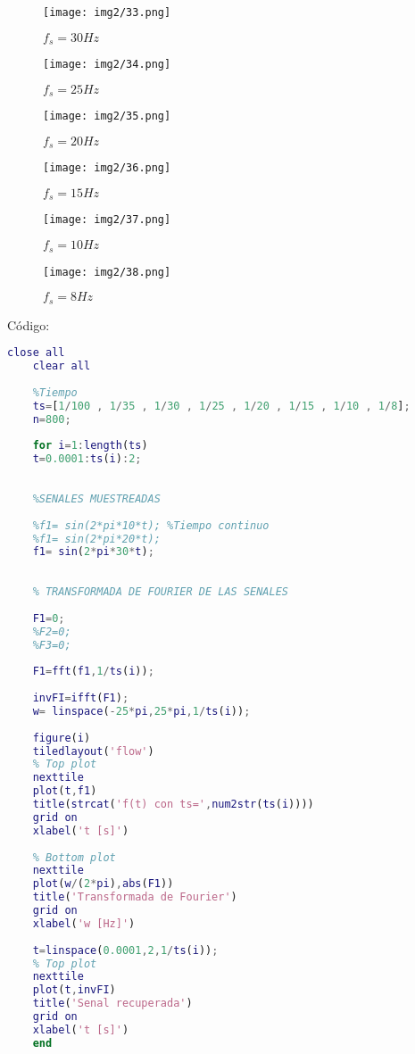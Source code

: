 \newpage

\begin{figure}[!htbp]
	\centering
	\texttt{[image: img2/33.png]}
	\caption{$f_s= 30 Hz$}
\end{figure}

\begin{figure}[!htbp]
	\centering
	\texttt{[image: img2/34.png]}
	\caption{$f_s= 25 Hz$}
\end{figure}

\newpage

\begin{figure}[!htbp]
	\centering
	\texttt{[image: img2/35.png]}
	\caption{$f_s= 20 Hz$}
\end{figure}

\begin{figure}[!htbp]
	\centering
	\texttt{[image: img2/36.png]}
	\caption{$f_s= 15 Hz$}
\end{figure}

\newpage

\begin{figure}[!htbp]
	\centering
	\texttt{[image: img2/37.png]}
	\caption{$f_s= 10 Hz$}
\end{figure}

\begin{figure}[!htbp]
	\centering
	\texttt{[image: img2/38.png]}
	\caption{$f_s= 8 Hz$}
\end{figure}

\newpage

Código:

\begin{lstlisting}[language=Matlab]
	close all
	clear all 
	
	%Tiempo
	ts=[1/100 , 1/35 , 1/30 , 1/25 , 1/20 , 1/15 , 1/10 , 1/8];
	n=800;
	
	for i=1:length(ts)
	t=0.0001:ts(i):2;
	
	
	%SENALES MUESTREADAS 
	
	%f1= sin(2*pi*10*t); %Tiempo continuo
	%f1= sin(2*pi*20*t); 
	f1= sin(2*pi*30*t);
	
	
	% TRANSFORMADA DE FOURIER DE LAS SENALES
	
	F1=0;
	%F2=0;
	%F3=0;
	
	F1=fft(f1,1/ts(i));
	
	invFI=ifft(F1);
	w= linspace(-25*pi,25*pi,1/ts(i));
	
	figure(i)
	tiledlayout('flow')
	% Top plot
	nexttile
	plot(t,f1)
	title(strcat('f(t) con ts=',num2str(ts(i))))
	grid on
	xlabel('t [s]')
	
	% Bottom plot
	nexttile
	plot(w/(2*pi),abs(F1))
	title('Transformada de Fourier')
	grid on
	xlabel('w [Hz]')
	
	t=linspace(0.0001,2,1/ts(i));
	% Top plot
	nexttile
	plot(t,invFI)
	title('Senal recuperada')
	grid on
	xlabel('t [s]')
	end
	
\end{lstlisting}


 


